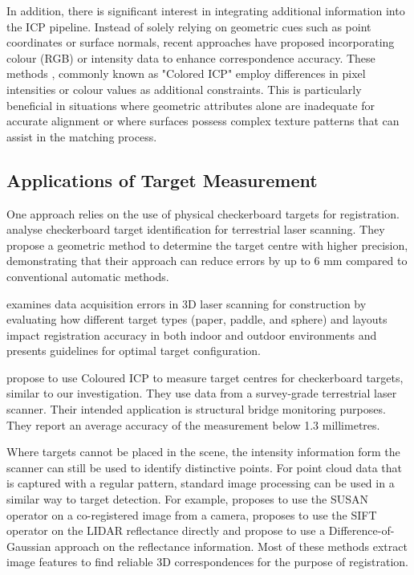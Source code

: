 In addition, there is significant interest in integrating additional information into the ICP pipeline. Instead of solely relying on geometric cues such as point coordinates or surface normals, recent approaches have proposed incorporating colour (RGB) or intensity data to enhance correspondence accuracy. These methods \citep{park_colored_2017, 5980407}, commonly known as "Colored ICP" employ differences in pixel intensities or colour values as additional constraints. This is particularly beneficial in situations where geometric attributes alone are inadequate for accurate alignment or where surfaces possess complex texture patterns that can assist in the matching process.

\subsection{Applications of Target Measurement}

One approach relies on the use of physical checkerboard targets for registration. \cite{fryskowska2019} analyse checkerboard target identification for terrestrial laser scanning. They propose a geometric method to determine the target centre with higher precision, demonstrating that their approach can reduce errors by up to 6 mm compared to conventional automatic methods.

\cite{becerik2011assessment} examines data acquisition errors in 3D laser scanning for construction by evaluating how different target types (paper, paddle, and sphere) and layouts impact registration accuracy in both indoor and outdoor environments and presents guidelines for optimal target configuration.

\citet{Liang2024} propose to use Coloured ICP to measure target centres for checkerboard targets, similar to our investigation. They use data from a survey-grade terrestrial laser scanner. Their intended application is structural bridge monitoring purposes. They report an average accuracy of the measurement below 1.3 millimetres.

Where targets cannot be placed in the scene, the intensity information form the scanner can still be used to identify distinctive points. For point cloud data that is captured with a regular pattern, standard image processing can be used in a similar way to target detection. For example, \citet{wendt_automation_2004} proposes to use the SUSAN operator on a co-registered image from a camera, \citet{bohm_automatic_2007} proposes to use the SIFT operator on the LIDAR reflectance directly and \citet{theiler_markerless_2013} propose to use a Difference-of-Gaussian approach on the reflectance information.
Most of these methods extract image features to find reliable 3D correspondences for the purpose of registration.

